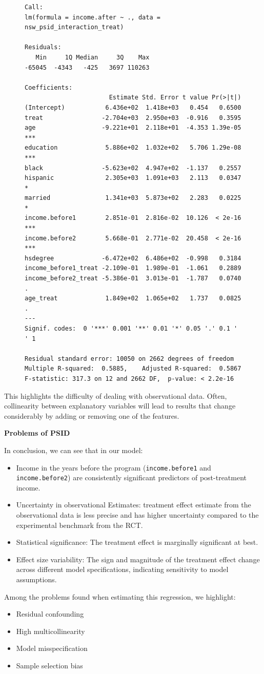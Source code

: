 \documentclass{article}
\begin{document}
\begin{figure}[H]
\centering
\begin{lstlisting}[style=Rstyle, caption=Backpropragation Result]
Call:
lm(formula = income.after ~ ., data = nsw_psid_interaction_treat)

Residuals:
   Min     1Q Median     3Q    Max 
-65045  -4343   -425   3697 110263 

Coefficients:
                       Estimate Std. Error t value Pr(>|t|)    
(Intercept)           6.436e+02  1.418e+03   0.454   0.6500    
treat                -2.704e+03  2.950e+03  -0.916   0.3595    
age                  -9.221e+01  2.118e+01  -4.353 1.39e-05 ***
education             5.886e+02  1.032e+02   5.706 1.29e-08 ***
black                -5.623e+02  4.947e+02  -1.137   0.2557    
hispanic              2.305e+03  1.091e+03   2.113   0.0347 *  
married               1.341e+03  5.873e+02   2.283   0.0225 *  
income.before1        2.851e-01  2.816e-02  10.126  < 2e-16 ***
income.before2        5.668e-01  2.771e-02  20.458  < 2e-16 ***
hsdegree             -6.472e+02  6.486e+02  -0.998   0.3184    
income_before1_treat -2.109e-01  1.989e-01  -1.061   0.2889    
income_before2_treat -5.386e-01  3.013e-01  -1.787   0.0740 .  
age_treat             1.849e+02  1.065e+02   1.737   0.0825 .  
---
Signif. codes:  0 '***' 0.001 '**' 0.01 '*' 0.05 '.' 0.1 ' ' 1

Residual standard error: 10050 on 2662 degrees of freedom
Multiple R-squared:  0.5885,	Adjusted R-squared:  0.5867 
F-statistic: 317.3 on 12 and 2662 DF,  p-value: < 2.2e-16
\end{lstlisting}
\end{figure}

This highlights the difficulty of dealing with observational data. Often, collinearity between explanatory variables will lead to results that change considerably by adding or removing one of the features.

\textbf{Problems of PSID}

In conclusion, we can see that in our model:

\begin{itemize}
    \item Income in the years before the program (\texttt{income.before1} and \texttt{income.before2}) are consistently significant predictors of post-treatment income.
    \item Uncertainty in observational Estimates: treatment effect estimate from the observational data is less precise and has higher uncertainty compared to the experimental benchmark from the RCT.
    \item Statistical significance: The treatment effect is marginally significant at best.
    \item Effect size variability: The sign and magnitude of the treatment effect change across different model specifications, indicating sensitivity to model assumptions.
\end{itemize}

Among the problems found when estimating this regression, we highlight:
\begin{itemize}
    \item Residual confounding
    \item High multicollinearity
    \item Model misspecification
    \item Sample selection bias
\end{itemize}
\end{document}
